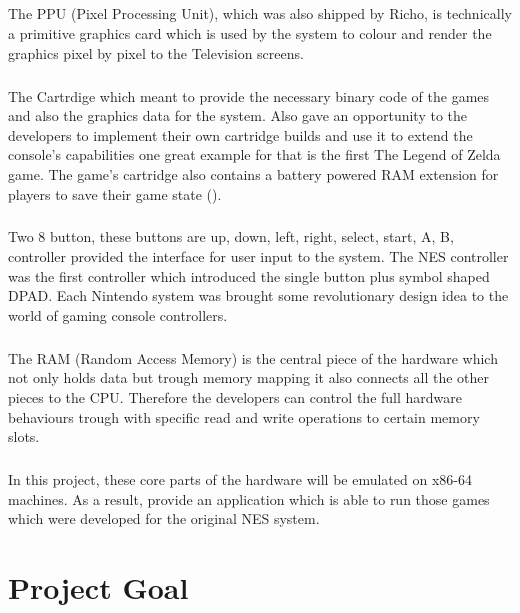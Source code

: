 \documentclass[]{report}
\begin{document}
\paragraph{ }
The PPU (Pixel Processing Unit), which was also shipped by Richo, is technically a primitive graphics card which is used by the system to colour and render the graphics pixel by pixel to the Television screens.
\paragraph{ }
The Cartrdige which meant to provide the necessary binary code of the games and also the graphics data for the system. Also gave an opportunity to the developers to implement their own cartridge builds and use it to extend the console's capabilities one great example for that is the first The Legend of Zelda game. The game's cartridge also contains a battery powered RAM extension for players to save their game state (\cite{ZELD}).
\paragraph{ }
Two 8 button, these buttons are up, down, left, right, select, start, A, B, controller provided the interface for user input to the system. The NES controller was the first controller which introduced the single button plus symbol shaped DPAD. Each Nintendo system was brought some revolutionary design idea to the world of gaming console controllers.
\paragraph{ }
The RAM (Random Access Memory) is the central piece of the hardware which not only holds data but trough memory mapping it also connects all the other pieces to the CPU. Therefore the developers can control the full hardware behaviours trough with specific read and write operations to certain memory slots.
\paragraph{ }
In this project, these core parts of the hardware will be emulated on x86-64 machines. As a result, provide an application which is able to run those games which were developed for the original NES system.


\chapter{Project Goal}
\end{document}
